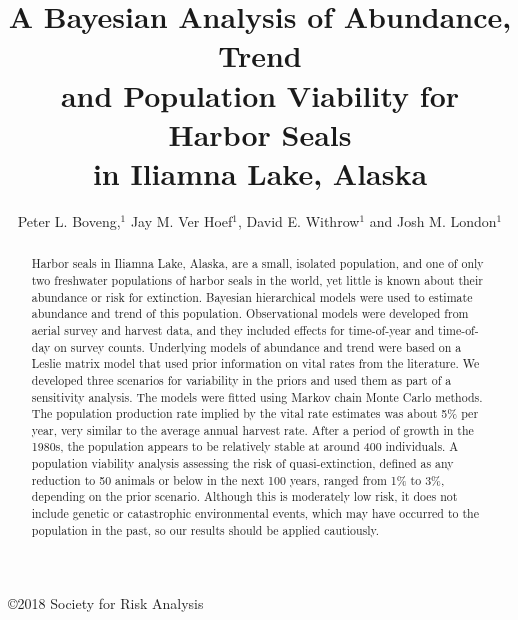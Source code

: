 \documentclass[]{risa}\usepackage[]{graphicx}\usepackage[]{color}
\begin{document}
\setcounter{table}{0}
\renewcommand{\thetable}{\Roman{table}}




\copyright{2018 Society for Risk Analysis}

\title[Abundance, Trend and Population Viability for Harbor Seals]{A Bayesian Analysis of Abundance, Trend \\ and Population Viability for Harbor Seals \\ in Iliamna Lake, Alaska}

\author[Peter L. Boveng]{Peter L. Boveng,$^{1}$
Jay M. Ver Hoef$^{1}$, David E. Withrow$^{1}$ and Josh M. London$^{1}$} 

\begin{abstract}
Harbor seals in Iliamna Lake, Alaska, are a small, isolated population, and one of only two freshwater populations of harbor seals in the world, yet little is known about their abundance or risk for extinction. Bayesian hierarchical models were used to estimate abundance and trend of this population. Observational models were developed from aerial survey and harvest data, and they included effects for time-of-year and time-of-day on survey counts. Underlying models of abundance and trend were based on a Leslie matrix model that used prior information on vital rates from the literature. We developed three scenarios for variability in the priors and used them as part of a sensitivity analysis. The models were fitted using Markov chain Monte Carlo methods. The population production rate implied by the vital rate estimates was about 5\% per year, very similar to the average annual harvest rate. After a period of growth in the 1980s, the population appears to be relatively stable at around 400 individuals. A population viability analysis assessing the risk of quasi-extinction, defined as any reduction to 50 animals or below in the next 100 years, ranged from 1\% to 3\%, depending on the prior scenario. Although this is moderately low risk, it does not include genetic or catastrophic environmental events, which may have occurred to the population in the past, so our results should be applied cautiously.
\end{abstract}
\end{document}
